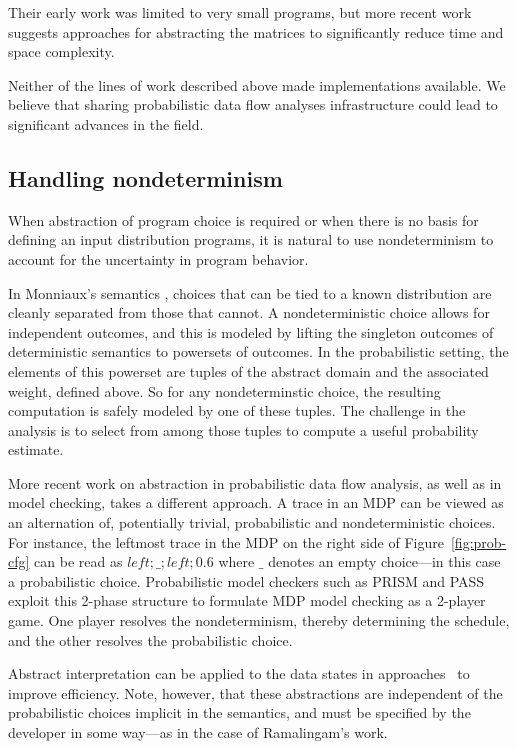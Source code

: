Their early work was limited to very small programs, but more recent
work suggests approaches for abstracting the matrices to significantly
reduce time and space complexity.   

Neither of the lines of work described above made implementations
available.  We believe that sharing probabilistic data flow analyses
infrastructure could lead to significant advances in the field.

\subsection{Handling nondeterminism}
When abstraction of program choice is required or when 
there is no basis for defining an input distribution programs,
it is natural to use nondeterminism to account for the uncertainty
in program behavior.

In Monniaux's semantics \cite{monniaux2005abstract}, choices that can be tied to a known
distribution are cleanly separated from those that cannot.
A nondeterministic choice allows for independent outcomes, and
this is modeled by lifting the singleton outcomes of deterministic
semantics to powersets of outcomes.
In the probabilistic setting, the elements of this powerset are
tuples of the abstract domain and the associated weight, defined
above.  So for any nondeterminstic choice, the resulting computation 
is safely modeled by one of these tuples.  The challenge in the
analysis is to select from among those tuples to compute a useful
probability estimate.

More recent work on abstraction in probabilistic data flow
analysis, as well as in model checking, takes a different approach.
A trace in an MDP can be viewed as an alternation of, potentially trivial,
probabilistic and nondeterministic choices.  For instance, the
leftmost trace in the MDP on the right side of Figure~\ref{fig:prob-cfg}
can be read as $\mathit{left};\_;\mathit{left};0.6$ where $\_$ 
denotes an empty choice---in this case a probabilistic choice.
Probabilistic model checkers such as PRISM and PASS exploit this
2-phase structure to formulate MDP model checking as a 2-player
game.  One player resolves the nondeterminism, thereby determining
the schedule, and the other resolves the probabilistic choice.

Abstract interpretation can be applied to the data states in
approaches~\cite{kwiatkowska2011prism,wachter2010best,esparza2011probabilistic}
to improve efficiency.  Note, however, that these abstractions are
independent of the probabilistic choices implicit in the semantics, and must be specified
by the developer in some way---as in the case of Ramalingam's work.

